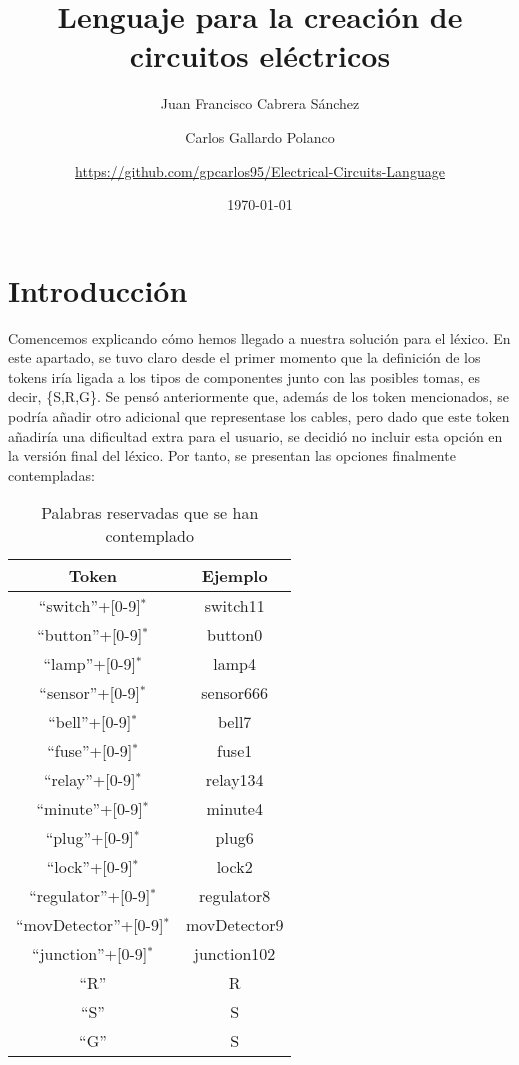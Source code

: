 \documentclass{article}
\author{Juan Francisco Cabrera Sánchez \and Carlos Gallardo Polanco \and \newline \url{https://github.com/gpcarlos95/Electrical-Circuits-Language}}
\title{Lenguaje para la creación de circuitos eléctricos}
\date{\today}
\begin{document}
\maketitle

\section{Introducción}
Comencemos explicando cómo hemos llegado a nuestra solución para el léxico. En este apartado, se tuvo claro desde el primer momento que la definición de los tokens iría ligada a los tipos de componentes junto con las posibles tomas, es decir, \{S,R,G\}. Se pensó anteriormente que, además de los token mencionados, se podría añadir otro adicional que representase los cables, pero dado que este token añadiría una dificultad extra para el usuario, se decidió no incluir esta opción en la versión final del léxico. Por tanto, se presentan las opciones finalmente contempladas:

\begin{table}[h!]
  \centering
  \begin{tabular}{|c|c|}
    \hline
    Token & Ejemplo \\ \hline
  ``switch''+[0-9]$^*$ & switch11 \\ \hline
  ``button''+[0-9]$^*$ & button0 \\ \hline
  ``lamp''+[0-9]$^*$ & lamp4 \\ \hline
  ``sensor''+[0-9]$^*$ & sensor666 \\ \hline
  ``bell''+[0-9]$^*$ & bell7 \\ \hline
  ``fuse''+[0-9]$^*$ & fuse1 \\ \hline
  ``relay''+[0-9]$^*$ & relay134 \\ \hline
  ``minute''+[0-9]$^*$ & minute4 \\ \hline
  ``plug''+[0-9]$^*$ & plug6 \\ \hline
  ``lock''+[0-9]$^*$ & lock2 \\ \hline
  ``regulator''+[0-9]$^*$ & regulator8 \\ \hline
  ``movDetector''+[0-9]$^*$ & movDetector9 \\ \hline
  ``junction''+[0-9]$^*$ & junction102 \\ \hline
  ``R'' & R \\ \hline
  ``S'' & S \\ \hline
  ``G'' & S \\ \hline
  \end{tabular}
  \caption{Palabras reservadas que se han contemplado}
  \label{}
\end{table}
\end{document}
